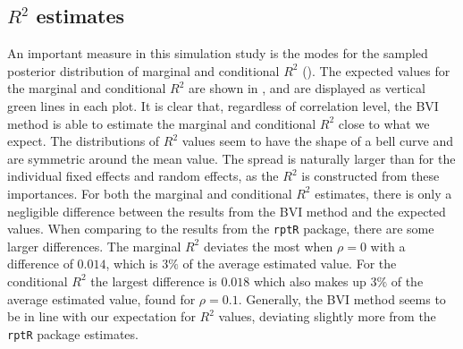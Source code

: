 \subsection{\texorpdfstring{$R^2$}{Lg} estimates}
An important measure in this simulation study is the modes for the sampled posterior distribution of marginal and conditional $R^2$ (). The expected values for the marginal and conditional $R^2$ are shown in , and are displayed as vertical green lines in each plot. It is clear that, regardless of correlation level, the BVI method is able to estimate the marginal and conditional $R^2$ close to what we expect. The distributions of $R^2$ values seem to have the shape of a bell curve and are symmetric around the mean value. The spread is naturally larger than for the individual fixed effects and random effects, as the $R^2$ is constructed from these importances. For both the marginal and conditional $R^2$ estimates, there is only a negligible difference between the results from the BVI method and the expected values. When comparing to the results from the \texttt{rptR} package, there are some larger differences. The marginal $R^2$ deviates the most when $\rho=0$ with a difference of $0.014$, which is $3\%$ of the average estimated value. For the conditional $R^2$ the largest difference is $0.018$ which also makes up $3\%$ of the average estimated value, found for $\rho=0.1$. Generally, the BVI method seems to be in line with our expectation for $R^2$ values, deviating slightly more from the \texttt{rptR} package estimates.
